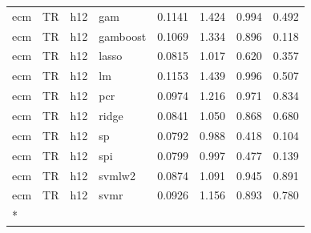 \begin{ThreePartTable}
\begin{longtable}[t]{llclcccc}
ecm & TR & h12 & gam & 0.1141 & 1.424 & 0.994 & 0.492\\
ecm & TR & h12 & gamboost & 0.1069 & 1.334 & 0.896 & 0.118\\
ecm & TR & h12 & lasso & 0.0815 & 1.017 & 0.620 & 0.357\\
ecm & TR & h12 & lm & 0.1153 & 1.439 & 0.996 & 0.507\\
ecm & TR & h12 & pcr & 0.0974 & 1.216 & 0.971 & 0.834\\
ecm & TR & h12 & ridge & 0.0841 & 1.050 & 0.868 & 0.680\\
ecm & TR & h12 & sp & 0.0792 & 0.988 & 0.418 & 0.104\\
ecm & TR & h12 & spi & 0.0799 & 0.997 & 0.477 & 0.139\\
ecm & TR & h12 & svmlw2 & 0.0874 & 1.091 & 0.945 & 0.891\\
ecm & TR & h12 & svmr & 0.0926 & 1.156 & 0.893 & 0.780\\*
\end{longtable}
\end{ThreePartTable}
\endgroup{}
